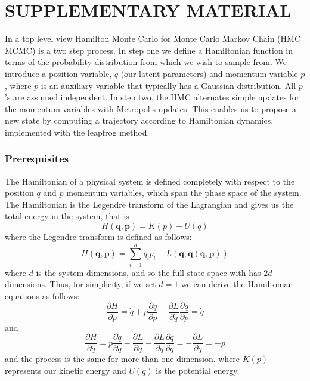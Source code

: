 \documentclass[twoside]{article}
\begin{document}
\section{SUPPLEMENTARY MATERIAL}
\label{sec:supmat}

In a top level view Hamilton Monte Carlo for Monte Carlo Markov Chain (HMC MCMC) is a two step process. In step one we define a Hamiltonian function in terms of the probability distribution from which we wish to sample from. We introduce a position variable, $q$ (our latent parameters) and momentum variable $p$, where $p$ is an auxiliary variable that typically has a Gaussian distribution.  All $p$'s are assumed independent. 
In step two, the HMC alternates simple updates for the momentum variables with Metropolis updates. This enables us to propose a new state by computing a trajectory according to Hamiltonian dynamics, implemented with the leapfrog method. 
\subsubsection{Prerequisites}
The Hamiltonian of a physical system is defined completely with respect to the position $q$ and $p$ momentum variables, which span the phase space of the system. The Hamiltonian is the Legendre transform of the Lagrangian and gives us the total energy in the system, that is \begin{equation}
\label{eq:hamreduced}
H(\textbf{q}, \textbf{p})  = K(p) + U(q)
\end{equation}
where the Legendre transform is defined as follows: 
\begin{equation}
\label{eq:hamiltonian}
H(\textbf{q},\textbf{p}) = \sum_{i = 1}^{d}\dot{q}_{l}p_{l} - L(\textbf{q}, \textbf{\.{q}}(\textbf{q}, \textbf{p}))
\end{equation}
where $d$ is the system dimensions, and so the full state space with has $2d$ dimensions.  
Thus, for simplicity, if we set $d = 1$ we can derive the Hamiltonian equations as follows:\begin{equation}
\label{eq:hameq1}
\frac{\partial H}{\partial p} = \dot{q} + p\frac{\partial \dot{q}}{\partial p} - \frac{\partial L}{\partial \dot{q}}\frac{\partial \dot{q}}{\partial p} = \dot{q} \end{equation}
and 
\begin{equation}
\label{eq:hameq2}
\frac{\partial H}{\partial q} = p\frac{\partial \dot{q}}{\partial q} - \frac{\partial L}{\partial q} - \frac{\partial L}{\partial \dot{q}}\frac{\partial \dot{q}}{\partial q} = - \frac{\partial L}{\partial q}= -\dot{p}  \end{equation}
and the process is the same for more than one dimension. 
where $K(p)$ represents our kinetic energy and $U(q)$ is the potential energy.
\end{document}
